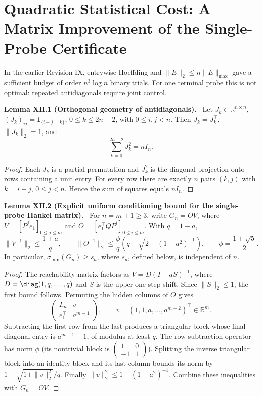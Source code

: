 \documentclass[11pt,a4paper,oneside]{book}
\newcommand{\R}{\mathbb R}\newcommand{\C}{\mathbb C}\newcommand{\Z}{\mathbb Z}\newcommand{\N}{\mathbb N}\newcommand{\Q}{\mathbb Q}
\newcommand{\one}{\mathbf 1}\newcommand{\ii}{\mathrm i}\newcommand{\dd}{\mathrm d}
\newcommand{\statement}[3]{\par\medskip\noindent\textbf{#1 #2 (#3).}\ }
\begin{document}
\chapter{Quadratic Statistical Cost: A Matrix Improvement of the Single-Probe Certificate}
In the earlier Revision IX, entrywise Hoeffding and $\|E\|_2\le n\|E\|_{\max}$ gave a sufficient budget of order $n^3\log n$ binary trials. For one terminal probe this is not optimal: repeated antidiagonals require joint control.
\statement{Lemma}{XII.1}{Orthogonal geometry of antidiagonals} Let $J_k\in\R^{n\times n}$, $(J_k)_{ij}=\one_{\{i+j=k\}}$, $0\le k\le2n-2$, with $0\le i,j<n$. Then $J_k=J_k^\top$, $\|J_k\|_2=1$, and
\begin{equation}\sum_{k=0}^{2n-2}J_k^2=nI_n.\tag{51}\end{equation}
\begin{proof}Each $J_k$ is a partial permutation and $J_k^2$ is the diagonal projection onto rows containing a unit entry. For every row there are exactly $n$ pairs $(k,j)$ with $k=i+j$, $0\le j<n$. Hence the sum of squares equals $nI_n$.\end{proof}
\statement{Lemma}{XII.2}{Explicit uniform conditioning bound for the single-probe Hankel matrix} For $n=m+1\ge3$, write $G_n=OV$, where $V=[P^je_1]_{0\le j\le m}$ and $O=[e_1^\top QP^i]_{0\le i\le m}$. With $q=1-a$,
\[\|V^{-1}\|_2\le\frac{1+a}q,\qquad\|O^{-1}\|_2\le\frac\phi q\left(q+\sqrt{2+(1-a^2)^{-1}}\right),\qquad\phi=\frac{1+\sqrt5}2.\]
In particular, $\sigma_{\min}(G_n)\ge s_a$, where $s_a$, defined below, is independent of $n$.
\begin{proof}The reachability matrix factors as $V=D(I-aS)^{-1}$, where $D=\diag(1,q,\ldots,q)$ and $S$ is the upper one-step shift. Since $\|S\|_2\le1$, the first bound follows. Permuting the hidden columns of $O$ gives
\[\begin{pmatrix}I_m&v\\e_1^\top&a^{m-1}\end{pmatrix},\qquad v=(1,1,a,\ldots,a^{m-2})^\top\in\R^m.\]
Subtracting the first row from the last produces a triangular block whose final diagonal entry is $a^{m-1}-1$, of modulus at least $q$. The row-subtraction operator has norm $\phi$ (its nontrivial block is $\left(\begin{smallmatrix}1&0\\-1&1\end{smallmatrix}\right)$). Splitting the inverse triangular block into an identity block and its last column bounds its norm by $1+\sqrt{1+\|v\|_2^2}/q$. Finally $\|v\|_2^2\le1+(1-a^2)^{-1}$. Combine these inequalities with $G_n=OV$.\end{proof}
\end{document}
